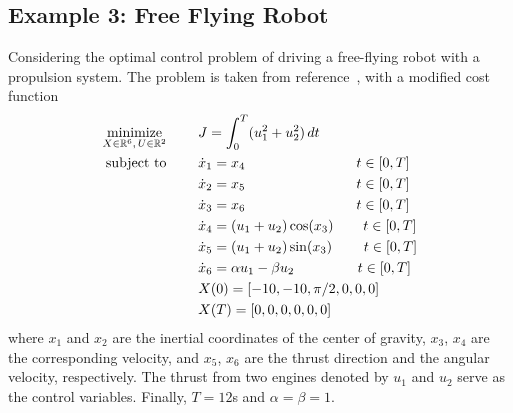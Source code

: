 \subsection*{Example 3: Free Flying Robot}
Considering the optimal control problem of driving a free-flying robot with a propulsion system. The problem is taken from reference~\cite{Betts:book:2010}, with a modified cost function
\begin{subequations}\label{eq:free}
	\begin{align}
	\underset{X \in \mathbb{R}^{6}, \, U \in \mathbb{R}^{2}}{\text{minimize}}\hspace{8mm}
	&J = \int_{0}^{T}(u_{1}^{2} +  u_{2}^{2})\,dt  \label{eq:freecost}\\
	\text{subject to} \hspace{8mm}
	& \dot{x}_1 = x_4 \hspace{28mm} t \in[0,T] \label{eq:freedyn1}\\
	& \dot{x}_2 = x_5 \hspace{28mm} t \in[0,T] \label{eq:freedyn2}\\
	& \dot{x}_3 = x_6\hspace{28mm} t \in[0,T] \label{eq:freedyn3}\\
	& \dot{x}_4 = (u_1 + u_2)\cos(x_3)\hspace{7.5mm} t \in[0,T] \label{eq:freedyn4}\\
	& \dot{x}_5 = (u_1 + u_2)\sin(x_3)\hspace{8mm} t \in[0,T] \label{eq:freedyn5}\\
	& \dot{x}_6 = \alpha u_1 - \beta u_2\hspace{16mm} t \in[0,T] \label{eq:freedyn6}\\
	&X(0) = [-10, -10, \pi/2, 0, 0, 0]\\
	&X(T) = [0, 0, 0, 0, 0, 0] \label{eq:freefinal1}		
	\end{align}
\end{subequations}
where $x_1$ and $x_2$ are the inertial coordinates of the center of gravity, $x_3$, $x_4$ are the corresponding velocity, and $x_5$, $x_6$ are the thrust direction and the angular velocity, respectively. The thrust from two engines denoted by $u_1$ and $u_2$ serve as the control variables. Finally, $T = 12$s and $\alpha = \beta = 1$.

